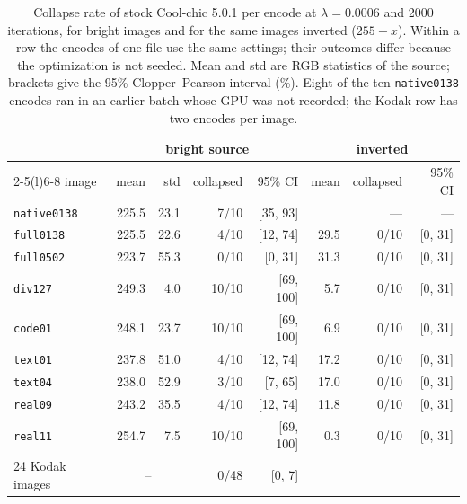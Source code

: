 \begin{table}[t]
\centering
\caption{\label{tab:rates}%
Collapse rate of stock Cool-chic 5.0.1 per encode at $\lambda = 0.0006$ and 2000 iterations,
for bright images and for the same images inverted ($255 - x$). Within a row the encodes of
one file use the same settings; their outcomes differ because the optimization is not
seeded. Mean and std are RGB statistics of the source; brackets give the 95\%
Clopper--Pearson interval (\%). Eight of the ten \texttt{native0138} encodes ran in an
earlier batch whose GPU was not recorded; the Kodak row has two encodes per image.}
\small\setlength{\tabcolsep}{4pt}
\begin{tabular}{lrrrr@{\hspace{10pt}}rrr}
\toprule
 & \multicolumn{4}{c}{bright source} & \multicolumn{3}{c}{inverted} \\
\cmidrule(lr){2-5}\cmidrule(l){6-8}
image & mean & std & collapsed & 95\% CI & mean & collapsed & 95\% CI \\
\midrule
\texttt{native0138} & 225.5 & 23.1 & 7/10 & [35, 93] &  & --- & --- \\
\texttt{full0138} & 225.5 & 22.6 & 4/10 & [12, 74] & 29.5 & 0/10 & [0, 31] \\
\texttt{full0502} & 223.7 & 55.3 & 0/10 & [0, 31] & 31.3 & 0/10 & [0, 31] \\
\texttt{div127} & 249.3 & 4.0 & 10/10 & [69, 100] & 5.7 & 0/10 & [0, 31] \\
\texttt{code01} & 248.1 & 23.7 & 10/10 & [69, 100] & 6.9 & 0/10 & [0, 31] \\
\texttt{text01} & 237.8 & 51.0 & 4/10 & [12, 74] & 17.2 & 0/10 & [0, 31] \\
\texttt{text04} & 238.0 & 52.9 & 3/10 & [7, 65] & 17.0 & 0/10 & [0, 31] \\
\texttt{real09} & 243.2 & 35.5 & 4/10 & [12, 74] & 11.8 & 0/10 & [0, 31] \\
\texttt{real11} & 254.7 & 7.5 & 10/10 & [69, 100] & 0.3 & 0/10 & [0, 31] \\
\midrule
24 Kodak images & \multicolumn{2}{c}{\V{kodakMinMean}--\V{kodakMaxMean}} & 0/48 & [0, 7] & & & \\
\bottomrule
\end{tabular}
\end{table}
